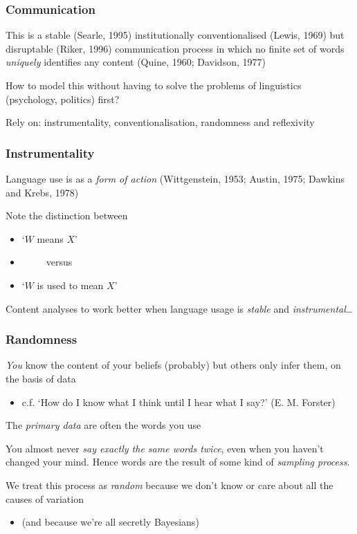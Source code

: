 \documentclass[11pt,compress,professionalfonts]{beamer}
\newcommand{\ita}{\begin{itemize}}
\newcommand{\itm}{\item[]}
\newcommand{\itz}{\end{itemize}}
\begin{document}
\begin{frame}[t,fragile]\frametitle{Communication}

This is a stable (Searle, 1995) institutionally conventionalised (Lewis, 1969) but disruptable (Riker, 1996) communication process
in which no finite set of words \textsl{uniquely} identifies any content (Quine, 1960; Davidson, 1977)

How to model this without having to solve the problems of linguistics (psychology, politics) first?

Rely on: instrumentality, conventionalisation, randomness and reflexivity

\end{frame}
\begin{frame}[t,fragile]\frametitle{Instrumentality}

Language use is as a \textit{form of action} (Wittgenstein, 1953; Austin, 1975; Dawkins and Krebs, 1978)

Note the distinction between
\ita
\itm `$W$ {means} $X$'
\itm ~~~~~versus
\itm `$W$ {is used to mean} $X$'
\itz

Content analyses to work better when language usage is \textit{stable} and \textit{instrumental}\ldots



\end{frame}
\begin{frame}[t,fragile]\frametitle{Randomness}

\textit{You} know the content of your beliefs (probably)
but others only infer them, on the basis of data
\ita
\itm c.f. `How do I know what I think until I hear what I say?' (E. M. Forster)
\itz
The \textsl{primary data} are often the words you use

You almost never \textit{say exactly the same words twice}, even when you haven't changed your mind.  Hence words are the result of some kind of \textsl{sampling process}.

We treat this process as \textsl{random} because we don't know or care about all the causes of variation
\ita
\itm (and because we're all secretly Bayesians)
\itz

%
%
%
%

\end{frame}
\end{document}
